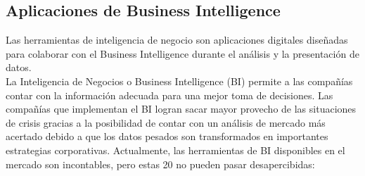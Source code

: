 \documentclass[%
 reprint,
 amsmath,amssymb,
 aps,
]{revtex4-1}
\begin{document}
\subsection{Aplicaciones de  Business Intelligence }
Las herramientas de inteligencia de negocio son aplicaciones digitales diseñadas para colaborar con el Business Intelligence durante el análisis y la presentación de datos.\\
La Inteligencia de Negocios o Business Intelligence (BI) permite a las compañías contar con la información adecuada para una mejor toma de decisiones.  Las compañías que implementan el BI logran sacar mayor provecho de las situaciones de crisis gracias a la posibilidad de contar con un análisis de mercado más acertado debido a que los datos pesados son transformados en importantes estrategias corporativas.
Actualmente, las herramientas de BI disponibles en el mercado son incontables, pero estas 20 no pueden pasar desapercibidas:
\end{document}
